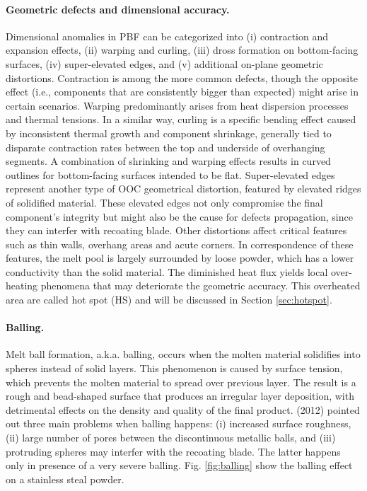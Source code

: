 \paragraph{Geometric defects and dimensional accuracy.} Dimensional anomalies in PBF can be categorized into (i) contraction and expansion effects, (ii) warping and curling, (iii) dross formation on bottom-facing surfaces, (iv) super-elevated edges, and (v) additional on-plane geometric distortions. Contraction is among the more common defects, though the opposite effect (i.e., components that are consistently bigger than expected) might arise in certain scenarios. Warping predominantly arises from heat dispersion processes and thermal tensions. In a similar way, curling is a specific bending effect caused by inconsistent thermal growth and component shrinkage, generally tied to disparate contraction rates between the top and underside of overhanging segments. A combination of shrinking and warping effects results in curved outlines for bottom-facing surfaces intended to be flat. Super-elevated edges represent another type of OOC geometrical distortion, featured by elevated ridges of solidified material. These elevated edges not only compromise the final component's integrity but might also be the cause for defects propagation, since they can interfer with recoating blade. Other distortions affect critical features such as thin walls, overhang areas and acute corners. In correspondence of these features, the melt pool is largely surrounded by loose powder, which has a lower conductivity than the solid material. The diminished heat flux yields local over-heating phenomena that may deteriorate the geometric accuracy. This overheated area are called hot spot (HS) and will be discussed in Section \ref{sec:hotspot}.
\paragraph{Balling.} Melt ball formation, a.k.a. balling, occurs when the molten material solidifies into spheres instead of solid layers. This phenomenon is caused by surface tension, which prevents the molten material to spread over previous layer. The result is a rough and bead-shaped surface that produces an irregular layer deposition, with detrimental effects on the density and quality of the final product. \citeauthor{li_balling_2012}(2012) pointed out three main problems when balling happens: (i) increased surface roughness, (ii) large number of pores between the discontinuous metallic balls, and (iii) protruding spheres may interfer with the recoating blade. The latter happens only in presence of a very severe balling. Fig. \ref{fig:balling} show the balling effect on a stainless steal powder.
